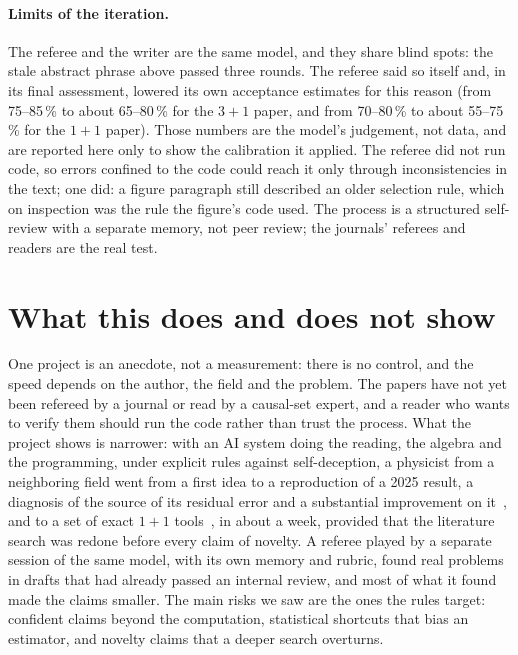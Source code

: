 \documentclass[11pt,a4paper]{article}
\begin{document}
\paragraph{Limits of the iteration.} The referee and the writer are the same model, and they share blind spots: the stale abstract phrase above passed three rounds. The referee said so itself and, in its final assessment, lowered its own acceptance estimates for this reason (from 75--85\,\% to about 65--80\,\% for the $3+1$ paper, and from 70--80\,\% to about 55--75\,\% for the $1+1$ paper). Those numbers are the model's judgement, not data, and are reported here only to show the calibration it applied. The referee did not run code, so errors confined to the code could reach it only through inconsistencies in the text; one did: a figure paragraph still described an older selection rule, which on inspection was the rule the figure's code used. The process is a structured self-review with a separate memory, not peer review; the journals' referees and readers are the real test.

\section{What this does and does not show}
One project is an anecdote, not a measurement: there is no control, and the speed depends on the author, the field and the problem. The papers have not yet been refereed by a journal or read by a causal-set expert, and a reader who wants to verify them should run the code rather than trust the process. What the project shows is narrower: with an AI system doing the reading, the algebra and the programming, under explicit rules against self-deception, a physicist from a neighboring field went from a first idea to a reproduction of a 2025 result, a diagnosis of the source of its residual error and a substantial improvement on it~\cite{Embedding}, and to a set of exact $1+1$ tools~\cite{Toolkit}, in about a week, provided that the literature search was redone before every claim of novelty. A referee played by a separate session of the same model, with its own memory and rubric, found real problems in drafts that had already passed an internal review, and most of what it found made the claims smaller. The main risks we saw are the ones the rules target: confident claims beyond the computation, statistical shortcuts that bias an estimator, and novelty claims that a deeper search overturns.
\end{document}
